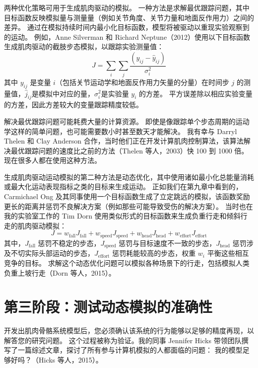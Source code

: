 两种优化策略可用于生成肌肉驱动的模拟。
一种方法是求解最优跟踪问题，其中目标函数反映模拟量与测量量（例如关节角度、关节力量和地面反作用力）之间的差异。
通过在模拟持续时间内最小化目标函数，模型将被驱动以重现实验观察到的运动。
例如，Anne Silverman 和 Richard Neptune（2012）使用以下目标函数生成肌肉驱动的截肢步态模拟，以跟踪实验测量值：
%
\begin{equation}
	J = \sum_{i} \sum_{j} \frac{(y_{ij} - \hat{y}_{ij})}{\sigma_i^2} \label{eq:10_2}
\end{equation}
%
其中 $y_{ij}$ 是变量 $i$（包括关节运动学和地面反作用力矢量的分量）在时间步 $j$ 的测量值，$\hat{j}_{ij}$是模拟中对应的量，$\sigma_i^2$是实验量 $y_i$ 的方差。
平方误差除以相应实验变量的方差，因此方差较大的变量跟踪精度较低。


解决最优跟踪问题可能耗费大量的计算资源。
即使是像跟踪单个步态周期的运动学这样的简单问题，也可能需要数小时甚至数天才能解决。
我有幸与 Darryl Thelen 和 Clay Anderson 合作，当时他们正在开发计算肌肉控制算法，该算法解决最优跟踪问题的速度比之前的方法（Thelen 等人，2003）快 100 到 1000 倍。
现在很多人都在使用这种方法。


生成肌肉驱动运动模拟的第二种方法是动态优化，其中使用诸如最小化总能量消耗或最大化运动表现指标之类的目标来生成运动。
正如我们在第九章中看到的，Carmichael Ong 及其同事使用一个目标函数生成了立定跳远的模拟，该函数奖励更长的距离并惩罚不良解决方案（例如那些可能导致受伤的解决方案）。
当时也在我的实验室工作的 Tim Dorn 使用类似形式的目标函数来生成负重行走和倾斜行走的肌肉驱动模拟：
%
\begin{equation}
	J = w_{\text{fall}} J_{\text{fall}} +
		w_{\text{speed}} J_{\text{speed}} + 
		w_{\text{head}} J_{\text{head}} + 
		w_{\text{effort}} J_{\text{effort}} \label{eq:10_3}
\end{equation}
%
其中，$J_{\text{fall}}$ 惩罚不稳定的步态，$J_{\text{speed}}$ 惩罚与目标速度不一致的步态，$J_{\text{head}}$ 惩罚涉及不切实际头部运动的步态，$J_{\text{effort}}$ 惩罚耗能较高的步态，权重 $w_i$ 平衡这些相互竞争的目标。
求解这个动态优化问题可以模拟各种场景下的行走，包括模拟人类负重上坡行走（Dorn 等人，2015）。



\section{第三阶段：测试动态模拟的准确性}

开发出肌肉骨骼系统模型后，您必须确认该系统的行为能够以足够的精度再现，以解答您的研究问题。
这个过程被称为验证。我的同事 Jennifer Hicks 带领团队撰写了一篇综述文章，探讨了所有参与计算机模拟的人都面临的问题：
我的模型足够好吗？（Hicks 等人，2015）。


